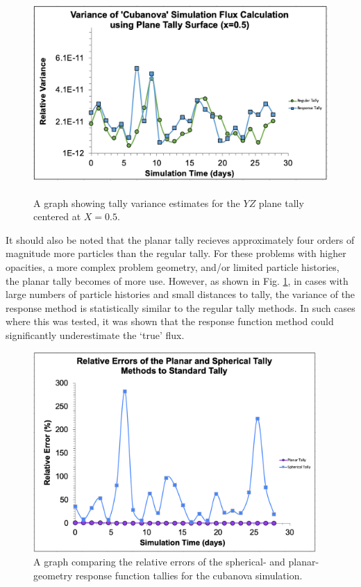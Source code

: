\documentclass[]{article}
\begin{document}
		\begin{figure} [h!]
			\centering
			\includegraphics[height=3in]{Figures/plane_avg_x=0_5.png}
			\caption{A graph showing tally variance estimates for the $YZ$ plane tally centered at $X=0.5$. }
			\label{fig:plane_avg_x=0.5.png}
		\end{figure}
		
		It should also be noted that the planar tally recieves approximately four orders of magnitude more particles than the regular tally. For these problems with higher opacities, a more complex problem geometry, and/or limited particle histories, the planar tally becomes of more use. However, as shown in Fig. \ref{fig:plane_avg_x=0.5.png}, in cases with large numbers of particle histories and small distances to tally, the variance of the response method is statistically similar to the regular tally methods. In such cases where this was tested, it was shown that the response function method could significantly underestimate the `true' flux.

		\begin{figure} [h!]
			\centering
			\includegraphics[height=3in]{Figures/relative_errors.png}
			\caption{A graph comparing the relative errors of the spherical- and planar-geometry response function tallies for the cubanova simulation. }
			\label{fig:relative_errors}
		\end{figure}
	
\end{document}
